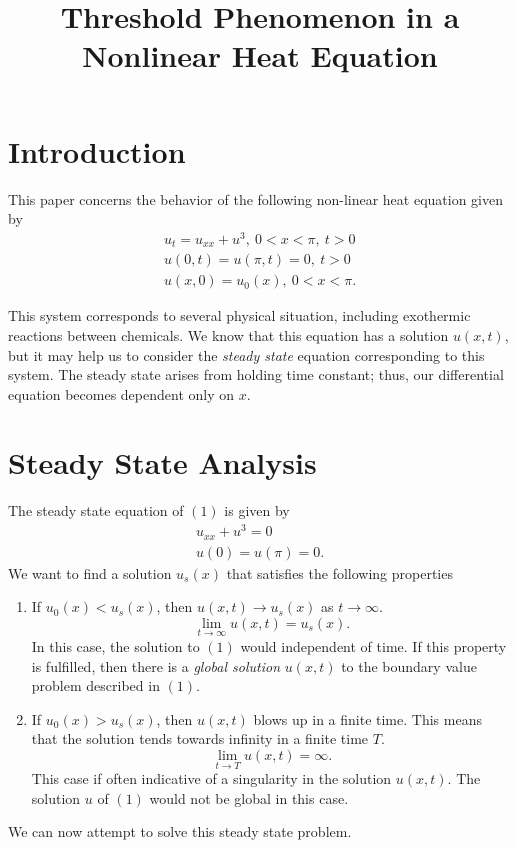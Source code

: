 \documentclass{hw}
\title{Threshold Phenomenon in a Nonlinear Heat Equation}
\author{}
\date{}
\begin{document}
\maketitle
\section{Introduction}

This paper concerns the behavior of the following non-linear heat equation given by
\begin{gather}
u_{t}=u_{xx}+u^{3},\ 0<x<\pi,\ t>0\\
u(0,t)=u(\pi,t)=0,\ t>0\\
u(x,0)=u_{0}(x),\ 0<x<\pi.
\end{gather}

This system corresponds to several physical situation, including exothermic reactions between
chemicals. We know that this equation has a solution $u(x,t)$, but it may help us to consider the
\textit{steady state} equation corresponding to this system. The steady state arises from holding
time constant; thus, our differential equation becomes dependent only on $x$.

\section{Steady State Analysis}
The steady state equation of $(1)$ is given by
\begin{gather}
u_{xx}+u^{3}=0\\
u(0)=u(\pi)=0.
\end{gather}
We want to find a solution $u_{s}(x)$ that satisfies the following properties
\begin{enumerate}
\item If $u_{0}(x)<u_{s}(x)$, then $u(x,t)\to u_{s}(x)$ as $t\to\infty$.
\[
\lim_{t\to \infty}u(x,t)=u_{s}(x).
\]
In this case, the solution to $(1)$ would independent of time. If this property is fulfilled, then
there is a \textit{global solution} $u(x,t)$ to the boundary value problem described in $(1)$.
\item If $u_{0}(x)>u_{s}(x)$, then $u(x,t)$ blows up in a finite time. This means that the solution
tends towards infinity in a finite time $T$.
\[
\lim_{t\to T}u(x,t)=\infty.
\]
This case if often indicative of a singularity in the solution $u(x,t)$. The solution $u$ of $(1)$
would not be global in this case.
\end{enumerate}
We can now attempt to solve this steady state problem.
\end{document}
